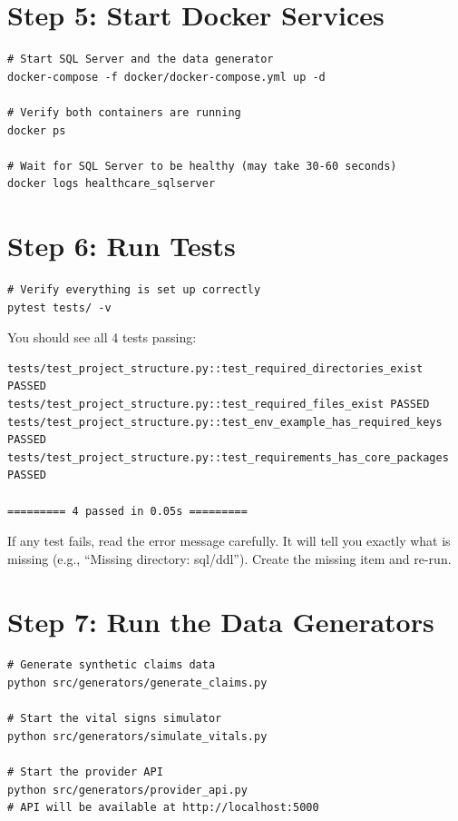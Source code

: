 \documentclass[12pt, a4paper, oneside]{report}
\begin{document}
\section{Step 5: Start Docker Services}

\begin{lstlisting}[style=bashstyle]
# Start SQL Server and the data generator
docker-compose -f docker/docker-compose.yml up -d

# Verify both containers are running
docker ps

# Wait for SQL Server to be healthy (may take 30-60 seconds)
docker logs healthcare_sqlserver
\end{lstlisting}

\section{Step 6: Run Tests}

\begin{lstlisting}[style=bashstyle]
# Verify everything is set up correctly
pytest tests/ -v
\end{lstlisting}

You should see all 4 tests passing:
\begin{lstlisting}[style=bashstyle]
tests/test_project_structure.py::test_required_directories_exist PASSED
tests/test_project_structure.py::test_required_files_exist PASSED
tests/test_project_structure.py::test_env_example_has_required_keys PASSED
tests/test_project_structure.py::test_requirements_has_core_packages PASSED

========= 4 passed in 0.05s =========
\end{lstlisting}

\begin{tipbox}
    If any test fails, read the error message carefully. It will tell you exactly what is missing (e.g., ``Missing directory: sql/ddl''). Create the missing item and re-run.
\end{tipbox}

\section{Step 7: Run the Data Generators}

\begin{lstlisting}[style=bashstyle]
# Generate synthetic claims data
python src/generators/generate_claims.py

# Start the vital signs simulator
python src/generators/simulate_vitals.py

# Start the provider API
python src/generators/provider_api.py
# API will be available at http://localhost:5000
\end{lstlisting}
\end{document}
